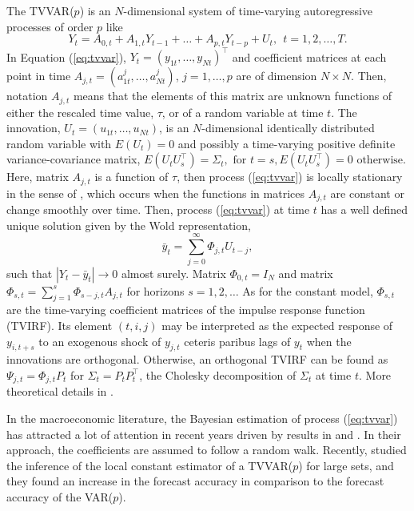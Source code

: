 The TVVAR($p$) is an $N$-dimensional system of time-varying autoregressive processes of order $p$ like
\begin{equation}
Y_{t}= A_{0,t}+ A_{1,t} Y_{t-1} + \ldots+ A_{p,t} Y_{t-p} + U_t, \ \  t= 1, 2,\ldots, T.
\label{eq:tvvar}
\end{equation}
In Equation (\ref{eq:tvvar}), $Y_t=(y_{1t}, \ldots, y_{Nt})^\top$ and coefficient matrices at each point in time $A_{j,t}=(a_{1t}^j, \ldots, a_{Nt}^j)$, $j=1, \ldots, p$ are of dimension $N\times N$. Then, notation $A_{j,t}$ means that the elements of this matrix are unknown functions of either the rescaled time value, $\tau$, or of a random variable at time $t$.  The innovation, $U_t=(u_{1t}, \ldots, u_{Nt})$, is an $N$-dimensional identically distributed random variable with $E(U_t) = 0$ and possibly a time-varying positive definite variance-covariance matrix, $E(U_t U_s^\top) =  \Sigma_t, \mbox{ for } t=s,  E(U_t U_s^\top)=0 \mbox{ otherwise}$. Here, matrix $A_{j, t}$ is a function of $\tau$, then process (\ref{eq:tvvar}) is locally stationary in the sense of \citet{Dahlhaus1997}, which occurs when the functions in matrices $A_{j, t}$ are constant or change smoothly over time. Then, process (\ref{eq:tvvar}) at time $t$ has a well defined unique solution given by the Wold representation,
\begin{equation}
\bar y_t = \sum_{j = 0}^\infty \Phi_{j, t}{U}_{t-j},
\label{eq:6}
\end{equation}
such that  $|Y_t - \bar y_t|\rightarrow 0$ almost surely. Matrix $\Phi_{0, t} = I_N$ and matrix $\Phi_{s,t}= \sum_{j=1}^s \Phi_{s-j,t} A_{j,t}$ for horizons $s = 1, 2,\ldots$ As for the constant model, $\Phi_{s,t}$ are the time-varying coefficient matrices of the impulse response function (TVIRF). Its element $(t, i, j)$ may be interpreted as the expected response of $y_{i, t+s}$ to an exogenous shock of $y_{j,t}$ ceteris paribus lags of $y_t$ when the innovations are orthogonal. Otherwise, an orthogonal TVIRF can be found as $\Psi_{j,t} = \Phi_{j,t} P_t$ for $\Sigma_t = P_t P_t^\top$, the Cholesky decomposition of $\Sigma_t$ at time $t$. More theoretical details in \cite{Yanetal2021}.

In the macroeconomic literature, the Bayesian estimation of process (\ref{eq:tvvar}) has attracted a lot of attention in recent years driven by results in \citet{CogleySargent2005, Primiceri2005} and \citet{Kapetaniosetal2012}. In their approach, the coefficients are assumed to follow a random walk. Recently, \citet{Kapetaniosetal2016} studied the inference of the local constant estimator of a TVVAR($p$) for large sets, and they found an increase in the forecast accuracy in comparison to the forecast accuracy of the VAR($p$).

